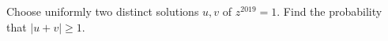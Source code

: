 Choose uniformly two distinct solutions $u,v$ of $z^{2019}=1$. Find the probability that $|u+v|\ge1$.
